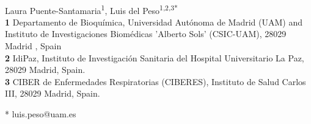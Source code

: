 \documentclass[10pt,letterpaper]{article}
\date{}
\begin{document}
	\vspace*{0.2in}
	
	\begin{flushleft}
		{\Large
			\textbf{} %
		}
		\newline
		\\
		Laura Puente-Santamaria\textsuperscript{1},
		Luis del Peso\textsuperscript{1,2,3*}
		\\
		\bigskip
		\textbf{1} Departamento de Bioquímica, Universidad Autónoma de Madrid (UAM) and Instituto de Investigaciones Biomédicas 'Alberto Sols' (CSIC-UAM), 28029 Madrid , Spain
		\\
		\textbf{2} IdiPaz, Instituto de Investigación Sanitaria del Hospital Universitario La Paz, 28029 Madrid, Spain.
		\\
		\textbf{3} CIBER de Enfermedades Respiratorias (CIBERES), Instituto de Salud Carlos III, 28029 Madrid, Spain.
		\\
		\bigskip
		
		
		
		
		
		
		* luis.peso@uam.es
		
	\end{flushleft}
\end{document}
